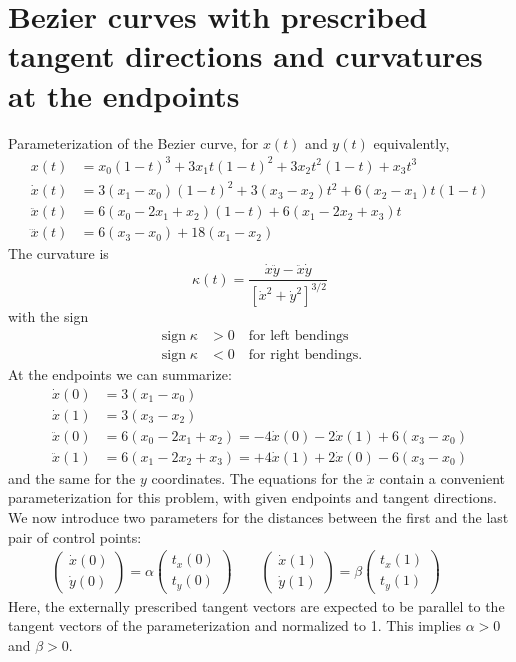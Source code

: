 \documentclass{article}
\newcommand{\sign}{\operatorname{sign}}
\begin{document}
\section{Bezier curves with prescribed tangent directions and curvatures at the endpoints}

Parameterization of the Bezier curve, for $x(t)$ and $y(t)$ equivalently,
%
\begin{align}
  x(t) &= x_0(1-t)^3 + 3x_1t(1-t)^2 + 3x_2t^2(1-t) + x_3 t^3\\
  \dot x(t) &= 3(x_1-x_0)(1-t)^2 + 3(x_3-x_2)t^2 + 6(x_2-x_1)t(1-t) \\
  \ddot x(t) &= 6(x_0 - 2x_1 + x_2)(1-t) + 6(x_1-2x_2+x_3) t \\
  \dddot x(t) &= 6(x_3-x_0) + 18(x_1-x_2)
\end{align}
%
The curvature is
\begin{equation}
  \kappa(t) = \frac{\dot x\ddot y - \ddot x\dot y}{[\dot x^2 + \dot y^2]^{3/2}}
\end{equation}
%
with the sign
%
\begin{equation}
  \begin{aligned}
    \sign\kappa &> 0 \quad\text{for left bendings}\\
    \sign\kappa &< 0 \quad\text{for right bendings.}
  \end{aligned}
\end{equation}
%
At the endpoints we can summarize:
%
\begin{align}
  \dot x(0)  &= 3(x_1 - x_0) \\
  \dot x(1)  &= 3(x_3 - x_2) \\
  \ddot x(0) &= 6(x_0 - 2x_1 + x_2) = -4\dot x(0) - 2\dot x(1) + 6(x_3 - x_0) \\
  \ddot x(1) &= 6(x_1 - 2x_2 + x_3) = +4\dot x(1) + 2\dot x(0) - 6(x_3 - x_0)
\end{align}
%
and the same for the $y$ coordinates.
The equations for the $\ddot x$ contain a convenient parameterization for this
problem, with given endpoints and tangent directions. We now introduce two
parameters for the distances between the first and the last pair of control
points:
%
\begin{align}
  \left(\begin{array}{cc}
    \dot x(0) \\ \dot y(0)
  \end{array}\right)
  = \alpha
  \left(\begin{array}{cc}
    t_x(0) \\ t_y(0)
  \end{array}\right) \qquad
  \left(\begin{array}{cc}
    \dot x(1) \\ \dot y(1)
  \end{array}\right)
  = \beta
  \left(\begin{array}{cc}
    t_x(1) \\ t_y(1)
  \end{array}\right) \qquad
\end{align}
%
Here, the externally prescribed tangent vectors are expected to be parallel to
the tangent vectors of the parameterization and normalized to 1. This implies
$\alpha>0$ and $\beta>0$.
\end{document}
